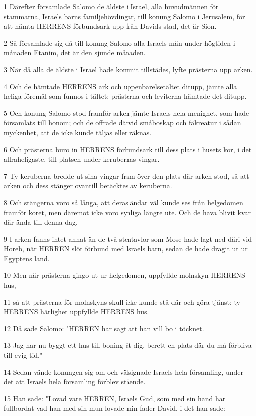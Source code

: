 \par 1 Därefter församlade Salomo de äldste i Israel, alla huvudmännen för stammarna, Israels barns familjehövdingar, till konung Salomo i Jerusalem, för att hämta HERRENS förbundsark upp från Davids stad, det är Sion.
\par 2 Så församlade sig då till konung Salomo alla Israels män under högtiden i månaden Etanim, det är den sjunde månaden.
\par 3 När då alla de äldste i Israel hade kommit tillstädes, lyfte prästerna upp arken.
\par 4 Och de hämtade HERRENS ark och uppenbarelsetältet ditupp, jämte alla heliga föremål som funnos i tältet; prästerna och leviterna hämtade det ditupp.
\par 5 Och konung Salomo stod framför arken jämte Israels hela menighet, som hade församlats till honom; och de offrade därvid småboskap och fäkreatur i sådan myckenhet, att de icke kunde täljas eller räknas.
\par 6 Och prästerna buro in HERRENS förbundsark till dess plats i husets kor, i det allraheligaste, till platsen under kerubernas vingar.
\par 7 Ty keruberna bredde ut sina vingar fram över den plats där arken stod, så att arken och dess stänger ovantill betäcktes av keruberna.
\par 8 Och stängerna voro så långa, att deras ändar väl kunde ses från helgedomen framför koret, men däremot icke voro synliga längre ute. Och de hava blivit kvar där ända till denna dag.
\par 9 I arken fanns intet annat än de två stentavlor som Mose hade lagt ned däri vid Horeb, när HERREN slöt förbund med Israels barn, sedan de hade dragit ut ur Egyptens land.
\par 10 Men när prästerna gingo ut ur helgedomen, uppfyllde molnskyn HERRENS hus,
\par 11 så att prästerna för molnskyns skull icke kunde stå där och göra tjänst; ty HERRENS härlighet uppfyllde HERRENS hus.
\par 12 Då sade Salomo: "HERREN har sagt att han vill bo i töcknet.
\par 13 Jag har nu byggt ett hus till boning åt dig, berett en plats där du må förbliva till evig tid."
\par 14 Sedan vände konungen sig om och välsignade Israels hela församling, under det att Israels hela församling förblev stående.
\par 15 Han sade: "Lovad vare HERREN, Israels Gud, som med sin hand har fullbordat vad han med sin mun lovade min fader David, i det han sade:
